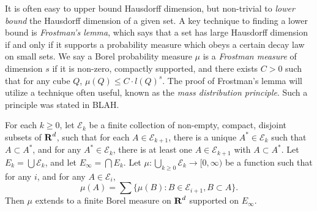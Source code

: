 It is often easy to upper bound Hausdorff dimension, but non-trivial to \emph{lower bound} the Hausdorff dimension of a given set. A key technique to finding a lower bound is \emph{Frostman's lemma}, which says that a set has large Hausdorff dimension if and only if it supports a probability measure which obeys a certain decay law on small sets. We say a Borel probability measure $\mu$ is a \emph{Frostman measure} of dimension $s$ if it is non-zero, compactly supported, and there exists $C > 0$ such that for any cube $Q$, $\mu(Q) \leq C \cdot l(Q)^s$. The proof of Frostman's lemma will utilize a technique often useful, known as the \emph{mass distribution principle}. Such a principle was stated in BLAH.

\begin{lemma}
	For each $k \geq 0$, let $\mathcal{E}_k$ be a finite collection of non-empty, compact, disjoint subsets of $\operatorname{\mathbf{R}}^d$, such that for each $A \in \mathcal{E}_{k+1}$, there is a unique $A^* \in \mathcal{E}_k$ such that $A \subset A^*$, and for any $A^* \in \mathcal{E}_k$, there is at least one $A \in \mathcal{E}_{k+1}$ with $A \subset A^*$. Let $E_k = \bigcup \mathcal{E}_k$, and let $E_\infty = \bigcap E_k$. Let $\mu: \bigcup_{k \geq 0} \mathcal{E}_k \to [0,\infty)$ be a function such that for any $i$, and for any $A \in \mathcal{E}_i$,
	\begin{equation} \label{equation124069350740597} \mu(A) = \sum \{ \mu(B) : B \in \mathcal{E}_{i+1}, B \subset A \}. \end{equation}
	Then $\mu$ extends to a finite Borel measure on $\operatorname{\mathbf{R}}^d$ supported on $E_\infty$.
\end{lemma}
